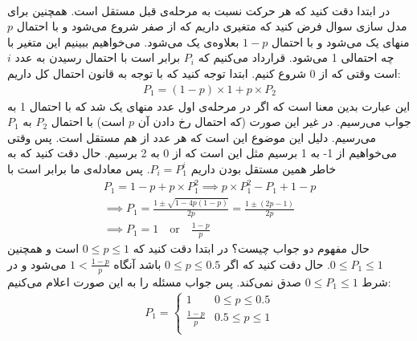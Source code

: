 \\
در ابتدا دقت کنید که هر حرکت نسبت به مرحله‌ی قبل مستقل است.
همچنین برای مدل سازی سوال فرض کنید که متغیری داریم که از صفر شروع می‌شود و با احتمال
$p$
منهای یک می‌شود و با احتمال
$1-p$
بعلاوه‌ی یک می‌شود. می‌خواهیم ببینیم این متغیر با چه احتمالی
1
می‌شود. قرارداد می‌کنیم که
$P_i$
برابر است با احتمال رسیدن به عدد
$i$
است وقتی که از 0 شروع کنیم.
ابتدا توجه کنید که با توجه به قانون احتمال کل داریم:
\begin{gather*}
    P_{1} = (1-p) \times 1 + p \times P_{2}
\end{gather*}
این عبارت بدین معنا است که اگر در مرحله‌‌ی اول عدد منهای یک شد که با احتمال 1 به جواب می‌رسیم. در غیر این صورت
(که احتمال رخ دادن آن
$p$
است)
با احتمال
$P_{2}$
به
$P_{1}$
می‌رسیم. دلیل این موضوع این است که هر عدد از هم مستقل است. پس وقتی می‌خواهیم از
1-
به
1
برسیم مثل این است که از 0 به
2 برسیم.
حال دقت کنید که به خاطر همین مستقل بودن داریم
$P_i = P_1^i$. پس معادله‌ی ما برابر است با
\begin{gather*}
    P_{1} = 1-p + p \times P_{1}^2 \implies p \times P_{1}^2 - P_{1} + 1-p\\
    \implies P_{1} = \frac{1 \pm \sqrt{1 - 4p(1-p)}}{2p} = \frac{1 \pm (2p - 1)}{2p}\\
    \implies P_{1} = 1 \quad \text{or} \quad \frac{1-p}{p}
\end{gather*}
حال مفهوم دو جواب چیست؟ در ابتدا دقت کنید که
$0 \leq p \leq 1$
است و همچنین
$0 \leq P_{1} \leq 1$.
حال دقت کنید که اگر
$0 \leq p \le 0.5$
باشد آنگاه
$1 < \frac{1-p}{p}$
می‌شود و در شرط
$0 \leq P_{1} \leq 1$
صدق نمی‌کند.
پس جواب مسئله را به این صورت اعلام می‌کنیم:
\begin{gather*}
    P_{1} = \begin{cases}
        1 & 0 \leq p \le 0.5\\
        \frac{1-p}{p} & 0.5 \leq p \leq 1\\
    \end{cases}
\end{gather*}
